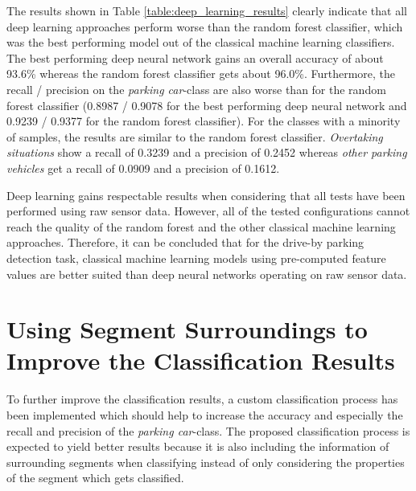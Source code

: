 The results shown in Table \ref{table:deep_learning_results} clearly indicate that all deep learning approaches perform worse than the random forest classifier, which was the best performing model out of the classical machine learning classifiers. The best performing deep neural network gains an overall accuracy of about 93.6\% whereas the random forest classifier gets about 96.0\%. Furthermore, the recall / precision on the \emph{parking car}-class are also worse than for the random forest classifier (0.8987 / 0.9078 for the best performing deep neural network and 0.9239 / 0.9377 for the random forest classifier). For the classes with a minority of samples, the results are similar to the random forest classifier. \emph{Overtaking situations} show a recall of 0.3239 and a precision of 0.2452 whereas \emph{other parking vehicles} get a recall of 0.0909 and a precision of 0.1612.

Deep learning gains respectable results when considering that all tests have been performed using raw sensor data. However, all of the tested configurations cannot reach the quality of the random forest and the other classical machine learning approaches. Therefore, it can be concluded that for the drive-by parking detection task, classical machine learning models using pre-computed feature values are better suited than deep neural networks operating on raw sensor data.






\section{Using Segment Surroundings to Improve the Classification Results}
\label{sec:using_surroundings_to_improve_results}

To further improve the classification results, a custom classification process has been implemented which should help to increase the accuracy and especially the recall and precision of the \emph{parking car}-class. The proposed classification process is expected to yield better results because it is also including the information of surrounding segments when classifying instead of only considering the properties of the segment which gets classified.

